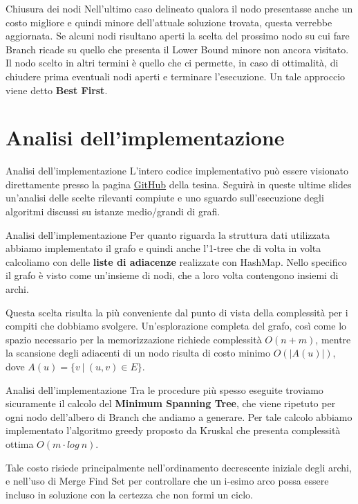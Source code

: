 \documentclass[10pt]{beamer}
\begin{document}
\begin{frame}{Chiusura dei nodi}
    Nell'ultimo caso delineato qualora il nodo presentasse anche un costo migliore e quindi minore dell'attuale soluzione trovata, questa verrebbe aggiornata.
    \newline
    \newline
    Se alcuni nodi risultano aperti la scelta del prossimo nodo su cui fare Branch ricade su quello che presenta il Lower Bound minore non ancora visitato.\newline
    Il nodo scelto in altri termini è quello che ci permette, in caso di ottimalità, di chiudere prima eventuali nodi aperti e terminare l'esecuzione. Un tale approccio viene detto \textbf{Best First}.
\end{frame}

\section{Analisi dell'implementazione}
\begin{frame}{Analisi dell'implementazione}
    L'intero codice implementativo può essere visionato direttamente presso la pagina \href{https://github.com/LorenzoSciandra/TesinaOttimizzazioneCombinatoria}{GitHub} della tesina. Seguirà in queste ultime slides un'analisi delle scelte rilevanti compiute e uno sguardo sull'esecuzione degli algoritmi discussi su istanze medio/grandi di grafi.
\end{frame}

\begin{frame}{Analisi dell'implementazione}
    Per quanto riguarda la struttura dati utilizzata abbiamo implementato il grafo e quindi anche l'1-tree che di volta in volta calcoliamo con delle \textbf{liste di adiacenze} realizzate con HashMap.\newline
    Nello specifico il grafo è visto come un'insieme di nodi, che a loro volta contengono insiemi di archi.
    
    Questa scelta risulta la più conveniente dal punto di vista della complessità per i compiti che dobbiamo svolgere. Un'esplorazione completa del grafo, così come lo spazio necessario per la memorizzazione richiede complessità $O(n+m)$, mentre la scansione degli adiacenti di un nodo risulta di costo minimo $O(|A(u)|)$, dove $A(u) = \{v \:|\: (u,v) \in E\}$.
\end{frame}

\begin{frame}{Analisi dell'implementazione}
    Tra le procedure più spesso eseguite troviamo sicuramente il calcolo del \textbf{Minimum Spanning Tree}, che viene ripetuto per ogni nodo dell'albero di Branch che andiamo a generare. Per tale calcolo abbiamo implementato l'algoritmo greedy proposto da Kruskal che presenta complessità ottima $O(m\cdot log\:n)$.
    
    Tale costo risiede principalmente nell'ordinamento decrescente iniziale degli archi, e nell'uso di Merge Find Set per controllare che un i-esimo arco possa essere incluso in soluzione con la certezza che non formi un ciclo.
\end{frame}
\end{document}
